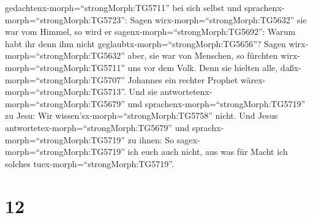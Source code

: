 gedachtenx-morph=``strongMorph:TG5711'' bei sich selbst und
sprachenx-morph=``strongMorph:TG5723'': Sagen
wirx-morph=``strongMorph:TG5632'' sie war vom Himmel, so wird er
sagenx-morph=``strongMorph:TG5692'': Warum habt ihr denn ihm nicht
geglaubtx-morph=``strongMorph:TG5656''?  Sagen
wirx-morph=``strongMorph:TG5632'' aber, sie war von Menschen, so
fürchten wirx-morph=``strongMorph:TG5711'' uns vor dem Volk. Denn sie
hielten alle, daßx-morph=``strongMorph:TG5707'' Johannes ein rechter
Prophet wärex-morph=``strongMorph:TG5713''.  Und sie
antwortetenx-morph=``strongMorph:TG5679'' und
sprachenx-morph=``strongMorph:TG5719'' zu Jesu: Wir
wissen'sx-morph=``strongMorph:TG5758'' nicht. Und Jesus
antwortetex-morph=``strongMorph:TG5679'' und
sprachx-morph=``strongMorph:TG5719'' zu ihnen: So
sagex-morph=``strongMorph:TG5719'' ich euch auch nicht, aus was für
Macht ich solches tuex-morph=``strongMorph:TG5719''.

\hypertarget{section-11}{%
\section{12}\label{section-11}}

